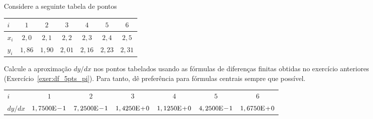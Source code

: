 \begin{exer}\label{exer:dfh4_tab}
  Considere a seguinte tabela de pontos
  \begin{center}
    \begin{tabular}{l|cccccc}
      $i$ & $1$ & $2$ & $3$ & $4$ & $5$ & $6$ \\\hline
      $x_i$ & $2,0$ & $2,1$ & $2,2$ & $2,3$ & $2,4$ & $2,5$ \\
      $y_i$ & $1,86$ & $1,90$ & $2,01$ & $2,16$ & $2,23$ & $2,31$ \\\hline
    \end{tabular}
  \end{center}
Calcule a aproximação $dy/dx$ nos pontos tabelados usando as fórmulas de diferenças finitas obtidas no exercício anteriores (Exercício~\ref{exer:df_5pts_pi}). Para tanto, dê preferência para fórmulas centrais sempre que possível.
\end{exer}
\begin{resp}
  \begin{tiny}
    \begin{center}
      \begin{tabular}{l|cccccc}\hline
        $i$ & $1$ & $2$ & $3$ & $4$ & $5$ & $6$ \\
        $dy/dx$ & $1,7500\mathrm{E}\!-\!1$ & $7,2500\mathrm{E}\!-\!1$ & $1,4250\mathrm{E}\!+\!0$ & $1,1250\mathrm{E}\!+\!0$ & $4,2500\mathrm{E}\!-\!1$ & $1,6750\mathrm{E}\!+\!0$ \\\hline
      \end{tabular}
    \end{center}
  \end{tiny}
\end{resp}
